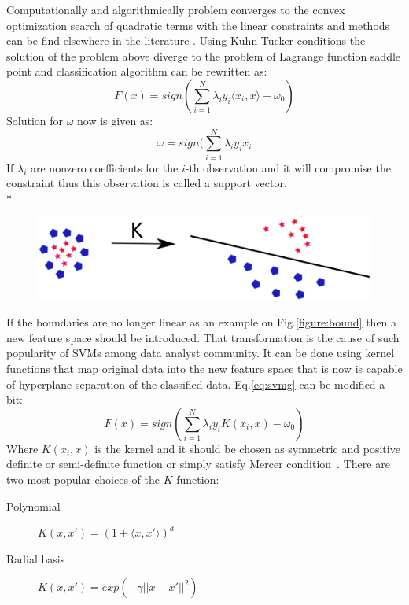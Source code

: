 Computationally and algorithmically problem converges to the convex optimization search of quadratic  terms with the linear constraints and methods can be find elsewhere in the literature \cite{book}. Using Kuhn-Tucker conditions the solution of the problem above diverge to the problem of Lagrange function saddle point and classification algorithm can be rewritten as:
\begin{equation}\label{eq:svmg}
F(x)=sign(\sum_{i=1}^{N} \lambda_iy_i\langle x_i,x\rangle-\omega_0)
\end{equation}
Solution for $\omega$ now is given as: 
\begin{equation}
\omega=sign(\sum_{i=1}^{N} \lambda_iy_ix_i
\end{equation}
If $\lambda_i$ are nonzero coefficients for the $i$-th observation and it will compromise the constraint thus this observation is called a support vector. \\*
\begin{figure}[h!]
\centering
\includegraphics[width=1\textwidth]{figures/chap3/bound.eps}
\caption{}
\label{figure:svm2}
\end{figure}
If the boundaries are no longer linear as an example on Fig.\ref{figure:bound} then a new feature space should be introduced. That transformation is the cause of such popularity of SVMs among data analyst community. It can be done using kernel functions that map original data into the new feature space that is now is capable of hyperplane separation of the classified data. Eq.\ref{eq:svmg} can be modified a bit: 
\begin{equation}\label{eq:svmg}
F(x)=sign(\sum_{i=1}^{N} \lambda_iy_iK(x_i,x)-\omega_0)
\end{equation} 
Where $K(x_i,x)$ is the kernel and it should be chosen as symmetric and positive definite or semi-definite function or simply satisfy Mercer condition~\cite{mercer}. There are two most popular choices of the $K$ function: 
\begin{description} \item[Polynomial] $K(x,x')=(1+\langle x,x'\rangle)^d$ \item[Radial basis]$K(x,x')=exp(-\gamma||x-x'||^2)$  \end{description}
